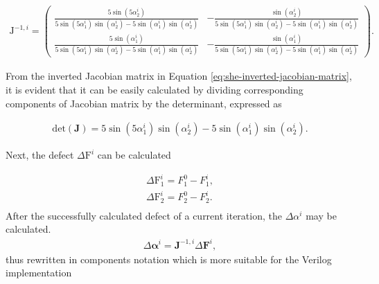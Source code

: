 \documentclass[a4paper, twoside, 11pt]{article}
\begin{document}
        \begin{equation}\label{eq:she-inverted-jacobian-matrix}
            \begin{gathered}
                \mathrm{J}^{-1,i} = 
                \begin{pmatrix}
                \frac{5 \sin(5\alpha_2^i)}{5 \sin(5\alpha_1^i) \sin(\alpha_2^i) - 5 \sin(\alpha_1^i)\sin(\alpha_2^i)} & - \frac{\sin(\alpha_2^i)}{5 \sin(5\alpha_1^i) \sin(\alpha_2^i) - 5 \sin(\alpha_1^i)\sin(\alpha_2^i)}\\
                    \frac{5\sin(\alpha_1^i)}{5 \sin(5\alpha_1^i) \sin(\alpha_2^i) - 5 \sin(\alpha_1^i)\sin(\alpha_2^i)} & - \frac{\sin(\alpha_1^i)}{5 \sin(5\alpha_1^i) \sin(\alpha_2^i) - 5 \sin(\alpha_1^i)\sin(\alpha_2^i)}
                \end{pmatrix}.
            \end{gathered}
        \end{equation}

        From the inverted Jacobian matrix in Equation \ref{eq:she-inverted-jacobian-matrix}, it is evident that it can be easily calculated by dividing corresponding components of Jacobian matrix by the determinant, expressed as

        \begin{equation}
            \begin{gathered}
                \mathrm{det}(\textbf{J}) = 5 \sin(5\alpha_1^i) \sin(\alpha_2^i) - 5 \sin(\alpha_1^i)\sin(\alpha_2^i).
            \end{gathered}
        \end{equation}


        Next, the defect $\Delta \mathrm{F}^i$ can be calculated

        \begin{equation}
            \begin{gathered}
                \Delta \mathrm{F}_1^i = F_1^0 - F_1^i,\\
                \Delta \mathrm{F}_2^i = F_2^0 - F_2^i.\\
            \end{gathered}
        \end{equation}
        After the successfully calculated defect of a current iteration, the $\Delta \alpha^i$ may be calculated.
        \begin{equation}
            \begin{gathered}
                \Delta \boldsymbol{\alpha}^i = \textbf{J}^{-1,i} \Delta \boldsymbol{F}^i,
            \end{gathered}
        \end{equation}
        thus rewritten in components notation which is more suitable for the Verilog implementation
\end{document}
